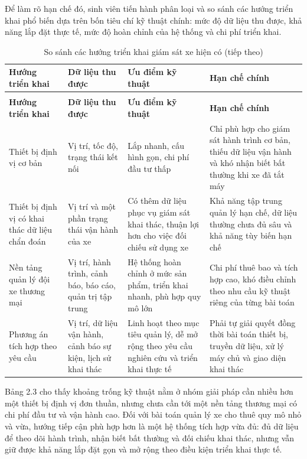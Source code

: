 \documentclass[a4paper]{extarticle}
\newcommand{\thesissettableid}[2]{%
  \renewcommand{\thetable}{#1}%
  \renewcommand{\theHtable}{#2}%
}
\begin{document}
Để làm rõ hạn chế đó, sinh viên tiến hành phân loại và so sánh các hướng triển khai phổ biến dựa trên bốn tiêu chí kỹ thuật chính: mức độ dữ liệu thu được, khả năng lắp đặt thực tế, mức độ hoàn chỉnh của hệ thống và chi phí triển khai.

{\thesissettableid{2.3}{condensed-r2-bang-2-3-so-sanh-cac-huong-trien-khai-giam-sat-xe-hien-co}
\def\LTcaptype{table}
\begin{longtable}{|L{(\linewidth - 6\tabcolsep) * }|L{(\linewidth - 6\tabcolsep) * }|L{(\linewidth - 6\tabcolsep) * }|L{(\linewidth - 6\tabcolsep) * }|}
\caption{So sánh các hướng triển khai giám sát xe hiện có}\label{tab:condensed-r2-bang-2-3-so-sanh-cac-huong-trien-khai-giam-sat-xe-hien-co}\\
\hline
\textbf{Hướng triển khai} & \textbf{Dữ liệu thu được} & \textbf{Ưu điểm kỹ thuật} & \textbf{Hạn chế chính} \\
\hline
\endfirsthead
\caption[]{So sánh các hướng triển khai giám sát xe hiện có (tiếp theo)}\\
\hline
\textbf{Hướng triển khai} & \textbf{Dữ liệu thu được} & \textbf{Ưu điểm kỹ thuật} & \textbf{Hạn chế chính} \\
\hline
\endhead
\endfoot
\endlastfoot
Thiết bị định vị cơ bản & Vị trí, tốc độ, trạng thái kết nối & Lắp nhanh, cấu hình gọn, chi phí đầu tư thấp & Chỉ phù hợp cho giám sát hành trình cơ bản, thiếu dữ liệu vận hành và khó nhận biết bất thường khi xe đã tắt máy \\\hline
Thiết bị định vị có khai thác dữ liệu chẩn đoán & Vị trí và một phần trạng thái vận hành của xe & Có thêm dữ liệu phục vụ giám sát khai thác, thuận lợi hơn cho việc đối chiếu sử dụng xe & Khả năng tập trung quản lý hạn chế, dữ liệu thường chưa đủ sâu và khả năng tùy biến hạn chế \\\hline
Nền tảng quản lý đội xe thương mại & Vị trí, hành trình, cảnh báo, báo cáo, quản trị tập trung & Hệ thống hoàn chỉnh ở mức sản phẩm, triển khai nhanh, phù hợp quy mô lớn & Chi phí thuê bao và tích hợp cao, khó điều chỉnh theo nhu cầu kỹ thuật riêng của từng bài toán \\\hline
Phương án tích hợp theo yêu cầu & Vị trí, dữ liệu vận hành, cảnh báo sự kiện, lịch sử khai thác & Linh hoạt theo mục tiêu quản lý, dễ mở rộng theo yêu cầu nghiên cứu và triển khai thực tế & Phải tự giải quyết đồng thời bài toán thiết bị, truyền dữ liệu, xử lý máy chủ và giao diện khai thác \\\hline
\end{longtable}
}
Bảng 2.3 cho thấy khoảng trống kỹ thuật nằm ở nhóm giải pháp cần nhiều hơn một thiết bị định vị đơn thuần, nhưng chưa cần tới một nền tảng thương mại có chi phí đầu tư và vận hành cao. Đối với bài toán quản lý xe cho thuê quy mô nhỏ và vừa, hướng tiếp cận phù hợp hơn là một hệ thống tích hợp vừa đủ: đủ dữ liệu để theo dõi hành trình, nhận biết bất thường và đối chiếu khai thác, nhưng vẫn giữ được khả năng lắp đặt gọn và mở rộng theo điều kiện triển khai thực tế.
\end{document}
